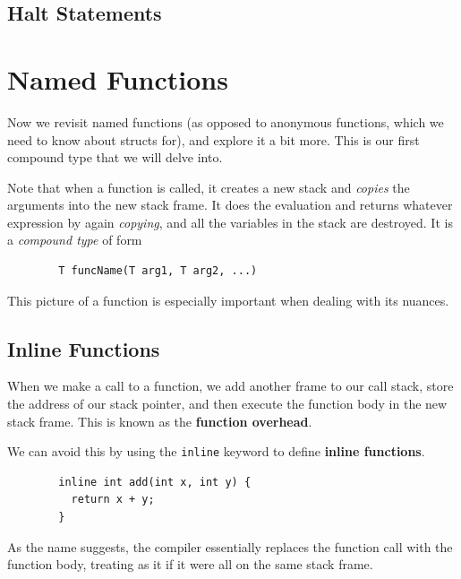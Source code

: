 \documentclass{article}
\newcounter{definition}[section]
\begin{document}
  \subsection{Halt Statements}

\section{Named Functions} 

    Now we revisit named functions (as opposed to anonymous functions, which we need to know about structs for), and explore it a bit more. This is our first compound type that we will delve into. 

    \begin{definition}
      \label{def:named-functions}
      Note that when a function is called, it creates a new stack and \textit{copies} the arguments into the new stack frame. It does the evaluation and returns whatever expression by again \textit{copying}, and all the variables in the stack are destroyed. It is a \textit{compound type} of form 
      \begin{lstlisting}
        T funcName(T arg1, T arg2, ...)
      \end{lstlisting}
    \end{definition}

    This picture of a function is especially important when dealing with its nuances. 
  
  \subsection{Inline Functions} 

    When we make a call to a function, we add another frame to our call stack, store the address of our stack pointer, and then execute the function body in the new stack frame. This is known as the \textbf{function overhead}. 

    \begin{definition}
      \label{def:inline-functions}
      We can avoid this by using the \texttt{inline} keyword to define \textbf{inline functions}. 
      \begin{lstlisting}
        inline int add(int x, int y) {
          return x + y; 
        }
      \end{lstlisting}
      As the name suggests, the compiler essentially replaces the function call with the function body, treating as it if it were all on the same stack frame. 
    \end{definition}
\end{document}
